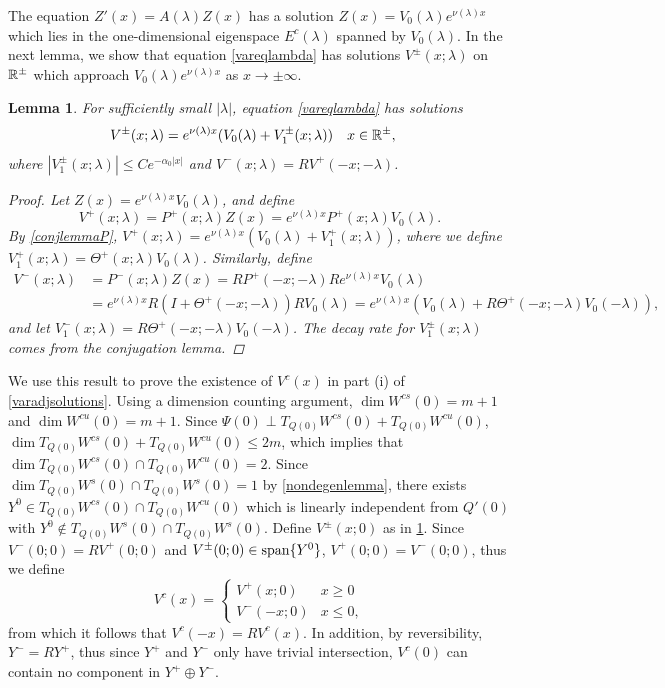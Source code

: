 \documentclass[12pt]{elsarticle}
\theoremstyle{plain}
\newtheorem{lemma}[theorem]{Lemma}
\theoremstyle{definition}
\theoremstyle{remark}
\numberwithin{theorem}{section}
\numberwithin{equation}{section}
\begin{document}
The equation $Z'(x) = A(\lambda) Z(x)$ has a solution $Z(x) = V_0(\lambda)e^{\nu(\lambda)x}$ which lies in the one-dimensional eigenspace $E^c(\lambda)$ spanned by $V_0(\lambda)$. In the next lemma, we show that equation \cref{vareqlambda} has solutions $V^\pm(x; \lambda)$ on $\mathbb{R}^\pm$ which approach $V_0(\lambda)e^{\nu(\lambda)x}$ as $x \rightarrow \pm \infty$. 

\begin{lemma}\label{lemma:Vpm}
For sufficiently small $|\lambda|$, equation \cref{vareqlambda} has solutions
\begin{align}\label{Vpmlambda}
V^\pm(x; \lambda) &= e^{\nu(\lambda)x}(V_0(\lambda) + V_1^\pm(x; \lambda)) && x \in \mathbb{R}^\pm,
\end{align}
where $|V_1^\pm(x; \lambda)| \leq C e^{-\alpha_0 |x|}$ and $V^-(x; \lambda) = R V^+(-x; -\lambda)$.
\begin{proof}
Let $Z(x) = e^{\nu(\lambda)x}V_0(\lambda)$, and define
\begin{equation}\label{defVplus}
V^+(x; \lambda) = P^+(x; \lambda) Z(x) = e^{\nu(\lambda)x}P^+(x; \lambda)V_0(\lambda).
\end{equation}
By \cref{conjlemmaP}, $V^+(x; \lambda) = e^{\nu(\lambda)x}( V_0(\lambda) + V_1^+(x; \lambda))$, where we define $V_1^+(x; \lambda) = \Theta^+(x; \lambda) V_0(\lambda)$. Similarly, define 
\begin{align*}
V^-(x; \lambda) &= P^-(x; \lambda) Z(x) = RP^+(-x; -\lambda)R e^{\nu(\lambda)x} V_0(\lambda) \\
&= e^{\nu(\lambda)x} R(I + \Theta^+(-x; -\lambda))R V_0(\lambda) = e^{\nu(\lambda)x}( V_0(\lambda) + R\Theta^+(-x; -\lambda) V_0(-\lambda) ),
\end{align*}
and let $V_1^-(x; \lambda) = R\Theta^+(-x; -\lambda) V_0(-\lambda)$. The decay rate for $V_1^\pm(x; \lambda)$ comes from the conjugation lemma.
\end{proof}
\end{lemma}

We use this result to prove the existence of $V^c(x)$ in part (i) of \cref{varadjsolutions}. Using a dimension counting argument, $\dim W^{cs}(0) = m + 1$ and $\dim W^{cu}(0) = m + 1$. Since $\Psi(0) \perp T_{Q(0)}W^{cs}(0) + T_{Q(0)}W^{cu}(0)$, $\dim T_{Q(0)}W^{cs}(0) + T_{Q(0)}W^{cu}(0) \leq 2m$, which implies that $\dim T_{Q(0)}W^{cs}(0) \cap T_{Q(0)}W^{cu}(0) = 2$. Since $\dim T_{Q(0)}W^s(0) \cap T_{Q(0)}W^s(0) = 1$ by \cref{nondegenlemma}, there exists $Y^0 \in T_{Q(0)}W^{cs}(0) \cap T_{Q(0)}W^{cu}(0)$ which is linearly independent from $Q'(0)$ with $Y^0 \notin T_{Q(0)}W^s(0) \cap T_{Q(0)}W^s(0)$. Define $V^\pm(x; 0)$ as in \cref{lemma:Vpm}. Since $V^-(0; 0) = R V^+(0; 0)$ and $V^\pm(0; 0) \in \mathop\mathrm{span}\nolimits \{Y^0 \}$, $V^+(0; 0) = V^-(0; 0)$, thus we define 
\[
V^c(x) = \begin{cases}
V^+(x; 0) & x \geq 0 \\
V^-(-x; 0) & x \leq 0,
\end{cases}
\]
from which it follows that $V^c(-x) = R V^c(x)$. In addition, by reversibility, $Y^- = R Y^+$, thus since $Y^+$ and $Y^-$ only have trivial intersection, $V^c(0)$ can contain no component in $Y^+ \oplus Y^-$. 
\end{document}
